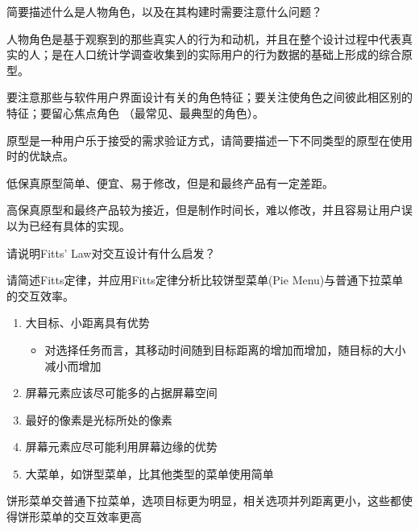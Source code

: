 \begin{problem}[2021]
简要描述什么是人物角色，以及在其构建时需要注意什么问题？
\end{problem}

\begin{solution}
人物角色是基于观察到的那些真实人的行为和动机，并且在整个设计过程中代表真实的人；是在人口统计学调查收集到的实际用户的行为数据的基础上形成的综合原型。

要注意那些与软件用户界面设计有关的角色特征；要关注使角色之间彼此相区别的特征；要留心焦点角色 （最常见、最典型的角色）。
\end{solution}



\begin{problem}[2021]
原型是一种用户乐于接受的需求验证方式，请简要描述一下不同类型的原型在使用时的优缺点。
\end{problem}

\begin{solution}
低保真原型简单、便宜、易于修改，但是和最终产品有一定差距。

高保真原型和最终产品较为接近，但是制作时间长，难以修改，并且容易让用户误以为已经有具体的实现。
\end{solution}



\begin{problem}[2021、2022、2023]
请说明Fitts' Law对交互设计有什么启发？

请简述Fitts定律，并应用Fitts定律分析比较饼型菜单(Pie Menu)与普通下拉菜单的交互效率。
\end{problem}

\begin{solution}
\begin{enumerate}[label=\arabic*.]
    \item 大目标、小距离具有优势
    \vspace{-0.4em}
    \begin{itemize}
        \item 对选择任务而言，其移动时间随到目标距离的增加而增加，随目标的大小减小而增加
    \end{itemize}
    \item 屏幕元素应该尽可能多的占据屏幕空间
    \item 最好的像素是光标所处的像素
    \item 屏幕元素应尽可能利用屏幕边缘的优势
    \item 大菜单，如饼型菜单，比其他类型的菜单使用简单
\end{enumerate}

饼形菜单交普通下拉菜单，选项目标更为明显，相关选项并列距离更小，这些都使得饼形菜单的交互效率更高
\end{solution}



